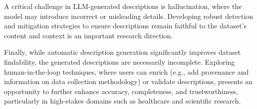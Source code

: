 A critical challenge in LLM-generated descriptions is hallucination, where the model may introduce incorrect or misleading details. Developing robust detection and mitigation strategies to ensure descriptions remain faithful to the dataset’s content and context is an important research direction.

Finally, while automatic description generation significantly improves dataset findability, the generated descriptions are necessarily incomplete. Exploring human-in-the-loop techniques, where users can enrich (e.g., add provenance and information on data collection methodology) or validate descriptions, presents an opportunity to further enhance accuracy, completeness, and trustworthiness, particularly in high-stakes domains such as healthcare and scientific research.


